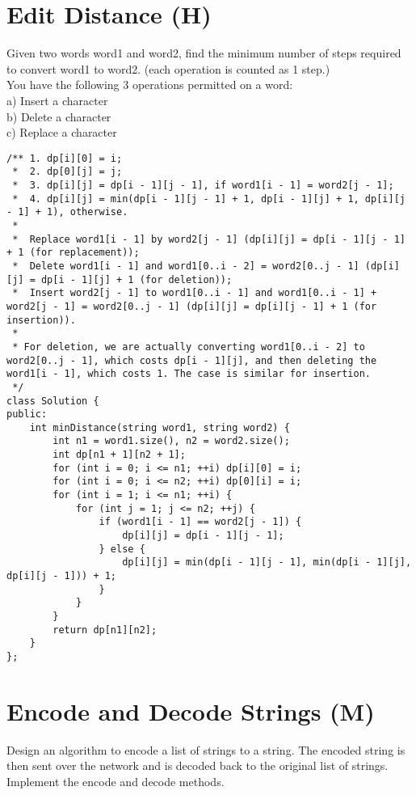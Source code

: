 \section{Edit Distance (H)}
Given two words word1 and word2, find the minimum number of steps required to convert word1 to word2. (each operation is counted as 1 step.)\\

You have the following 3 operations permitted on a word:\\
a) Insert a character\\
b) Delete a character\\
c) Replace a character\\

\begin{lstlisting}
/** 1. dp[i][0] = i;
 *  2. dp[0][j] = j;
 *  3. dp[i][j] = dp[i - 1][j - 1], if word1[i - 1] = word2[j - 1];
 *  4. dp[i][j] = min(dp[i - 1][j - 1] + 1, dp[i - 1][j] + 1, dp[i][j - 1] + 1), otherwise.
 * 
 *  Replace word1[i - 1] by word2[j - 1] (dp[i][j] = dp[i - 1][j - 1] + 1 (for replacement));
 *  Delete word1[i - 1] and word1[0..i - 2] = word2[0..j - 1] (dp[i][j] = dp[i - 1][j] + 1 (for deletion));
 *  Insert word2[j - 1] to word1[0..i - 1] and word1[0..i - 1] + word2[j - 1] = word2[0..j - 1] (dp[i][j] = dp[i][j - 1] + 1 (for insertion)).
 *  
 * For deletion, we are actually converting word1[0..i - 2] to word2[0..j - 1], which costs dp[i - 1][j], and then deleting the word1[i - 1], which costs 1. The case is similar for insertion. 
 */
class Solution {
public:
    int minDistance(string word1, string word2) {
        int n1 = word1.size(), n2 = word2.size();
        int dp[n1 + 1][n2 + 1];
        for (int i = 0; i <= n1; ++i) dp[i][0] = i;
        for (int i = 0; i <= n2; ++i) dp[0][i] = i;
        for (int i = 1; i <= n1; ++i) {
            for (int j = 1; j <= n2; ++j) {
                if (word1[i - 1] == word2[j - 1]) {
                    dp[i][j] = dp[i - 1][j - 1];
                } else {
                    dp[i][j] = min(dp[i - 1][j - 1], min(dp[i - 1][j], dp[i][j - 1])) + 1;
                }
            }
        }
        return dp[n1][n2];
    }
};
\end{lstlisting}


\section{Encode and Decode Strings (M)}
Design an algorithm to encode a list of strings to a string. The encoded string is then sent over the network and is decoded back to the original list of strings. Implement the encode and decode methods.\\

